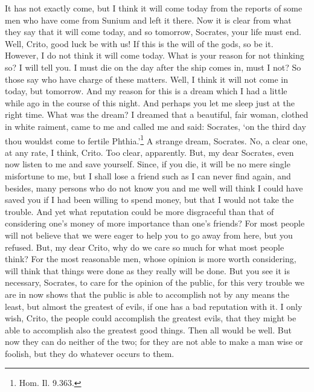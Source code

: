 \documentclass[letterpaper,12pt]{article}
\begin{document}
\begin{drama}
\critospeaks 
It has not exactly come, but I think it will come today from the reports of some men who have come from Sunium and left it there. Now it is clear from what they say that it will come today, and so tomorrow, Socrates, your life must end.
\socratesspeaks 
Well, Crito, good luck be with us! If this is the will of the gods, so be it. However, I do not think  it will come today.
\critospeaks 
What is your reason for not thinking so?
\socratesspeaks 
I will tell you. I must die on the day after the ship comes in, must I not?
\critospeaks 
So those say who have charge of these matters.
\socratesspeaks 
Well, I think it will not come in today, but tomorrow. And my reason for this is a dream which I had a little while ago in the course of this night. And perhaps you let me sleep just at the right time.
\critospeaks 
What was the dream?
\socratesspeaks 
I dreamed that a beautiful, fair woman, clothed in white raiment, came to me and called me  and said: Socrates, `on the third day thou wouldst come to fertile Phthia.'\footnote{Hom. Il. 9.363.}
\critospeaks 
A strange dream, Socrates.
\socratesspeaks 
No, a clear one, at any rate, I think, Crito.
\critospeaks 
Too clear, apparently. But, my dear Socrates, even now listen to me and save yourself. Since, if you die, it will be no mere single misfortune to me, but I shall lose a friend such as I can never find again, and besides, many persons who do not know you and me well  will think I could have saved you if I had been willing to spend money, but that I would not take the trouble. And yet what reputation could be more disgraceful than that of considering one's money of more importance than one's friends? For most people will not believe that we were eager to help you to go away from here, but you refused.
\socratesspeaks 
But, my dear Crito, why do we care so much for what most people think? For the most reasonable men, whose opinion is more worth considering, will think that things were done as they really will be done. 
\critospeaks 
But you see it is necessary, Socrates, to care for the opinion of the public, for this very trouble we are in now shows that the public is able to accomplish not by any means the least, but almost the greatest of evils, if one has a bad reputation with it.
\socratesspeaks 
I only wish, Crito, the people could accomplish the greatest evils, that they might be able to accomplish also the greatest good things. Then all would be well. But now they can do neither of the two; for they are not able to make a man wise or foolish, but they do whatever occurs to them. 

\end{drama}
\end{document}

